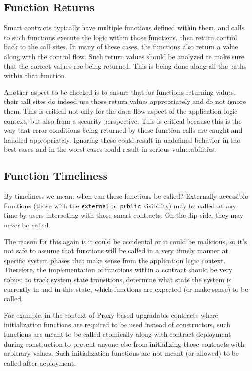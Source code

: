 \subsection{Function Returns}\label{function-returns}

Smart contracts typically have multiple functions defined within them,
and calls to such functions execute the logic within those functions,
then return control back to the call sites. In many of these cases, the
functions also return a value along with the control flow. Such return
values should be analyzed to make sure that the correct values are being
returned. This is being done along all the paths within that function.

Another aspect to be checked is to ensure that for functions returning
values, their call sites do indeed use those return values appropriately
and do not ignore them. This is critical not only for the data flow
aspect of the application logic context, but also from a security
perspective. This is critical because this is the way that error
conditions being returned by those function calls are caught and handled
appropriately. Ignoring these could result in undefined behavior in the
best cases and in the worst cases could result in serious
vulnerabilities.

\subsection{Function Timeliness}\label{function-timeliness}

By timeliness we mean: when can these functions be called? Externally
accessible functions (those with the \texttt{external} or
\texttt{public} visibility) may be called at any time by users
interacting with those smart contracts. On the flip side, they may never
be called.

The reason for this again is it could be accidental or it could be
malicious, so it's not safe to assume that functions will be called in a
very timely manner at specific system phases that make sense from the
application logic context. Therefore, the implementation of functions
within a contract should be very robust to track system state
transitions, determine what state the system is currently in and in this
state, which functions are expected (or make sense) to be called.

For example, in the context of Proxy-based upgradable contracts where
initialization functions are required to be used instead of
constructors, such functions are meant to be called atomically along
with contract deployment during construction to prevent anyone else from
initializing those contracts with arbitrary values. Such initialization
functions are not meant (or allowed) to be called after deployment.

